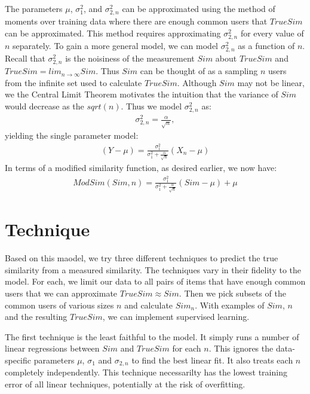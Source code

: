 \documentclass[11pt]{article}
\begin{document}
The parameters $\mu$, $\sigma_{1}^2$, and $\sigma_{2,n}^2$ can be approximated 
using the method of moments over training data where there are enough common
users that $TrueSim$ can be approximated. This method requires approximating
$\sigma_{2,n}^2$ for every value of $n$ separately. To gain a more general 
model, we can model $\sigma_{2,n}^2$ as a function of $n$. Recall that 
$\sigma_{2,n}^2$ is the noisiness of the measurement $Sim$ about $TrueSim$ and $TrueSim = lim_{n \to
\infty}Sim$. Thus $Sim$ can be thought of as a sampling $n$ users from the
infinite set used to calculate $TrueSim$. Although $Sim$ may not be linear, we
the Central Limit Theorem motivates the intuition that the variance of $Sim$
would decrease as the $sqrt(n)$. Thus we model $\sigma_{2,n}^2$ as:
\begin{align}
\sigma_{2,n}^2 = \frac{\alpha}{\sqrt{n}},
\end{align}
yielding the single parameter model:
\begin{align}
\left(Y - \mu\right) = \frac{\sigma_{1}^2}{\sigma_{1}^2+\frac{\alpha}{\sqrt{n}}}
\left(X_n-\mu\right)
\end{align}
In terms of a modified similarity function, as desired earlier, we now have:
\begin{align}
ModSim(Sim, n) = \frac{\sigma_{1}^2}{\sigma_{1}^2+\frac{\alpha}{\sqrt{n}}}
\left(Sim-\mu\right) + \mu
\end{align}

\section*{Technique}
Based on this maodel, we try three different techniques to predict the true similarity from a
measured similarity. The techniques vary in their fidelity to the model. For
each, we limit our data to all pairs of items that have enough common users that
we can approximate $TrueSim \approx Sim$. Then we pick subsets of the common
users of various sizes $n$ and calculate $Sim_{n}$. With examples of $Sim$, $n$
and the resulting $TrueSim$, we can implement supervised learning.

The first technique is the least faithful to the model. It simply runs a number
of linear regressions between $Sim$ and $TrueSim$ for each $n$. This ignores the 
data-specific parameters $\mu$, $\sigma_{1}$ and $\sigma_{2,n}$ to find the best 
linear fit. It also treats each $n$ completely independently. This technique 
necessarilty has the lowest training error of all linear techniques, potentially 
at the risk of overfitting.
\end{document}
